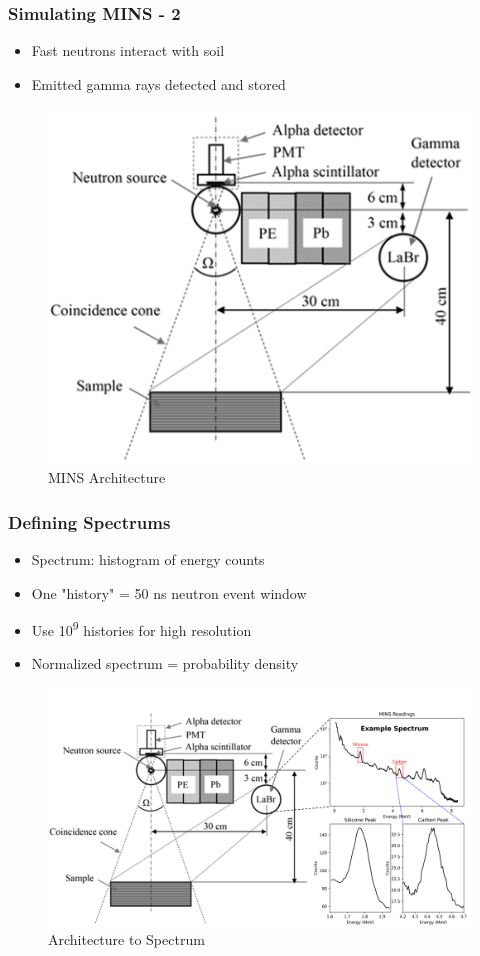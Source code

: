 \documentclass[xcolor=dvipsnames,envcountsect]{beamer}
\begin{document}
\begin{frame}
  \frametitle{Simulating MINS - 2}
  \begin{itemize}
    \item Fast neutrons interact with soil
    \item Emitted gamma rays detected and stored
  \end{itemize}
  \begin{figure}
      \centering
      \includegraphics[width=.5\linewidth]{Figures/minsarchitecture.png}
      \caption{MINS Architecture}
      \label{fig:MINSArchitecture}
  \end{figure}
\end{frame}

\begin{frame}
  \frametitle{Defining Spectrums}
  \begin{itemize}
    \item Spectrum: histogram of energy counts
    \item One "history" = 50 ns neutron event window
    \item Use 10\textsuperscript{9} histories for high resolution
    \item Normalized spectrum = probability density
  \end{itemize}
  \begin{figure}
      \centering
      \includegraphics[width=.7\linewidth]{Figures/archtospec.png}
      \caption{Architecture to Spectrum}
      \label{fig:archtospec}
  \end{figure}
\end{frame}
\end{document}
